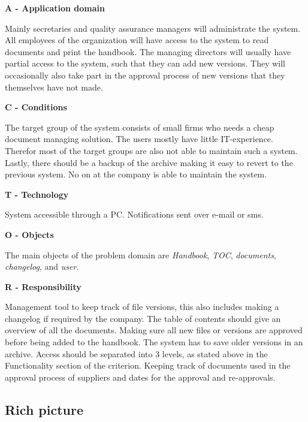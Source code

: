 \textbf{A - Application domain}

Mainly secretaries and quality assurance managers will administrate the system.
All employees of the organization will have access to the system to read documents and print the handbook.
The managing directors will usually have partial access to the system, such that they can add new versions.
They will occasionally also take part in the approval process of new versions that they themselves have not made.

\textbf{C - Conditions}

The target group of the system consists of small firms who needs a cheap document managing solution.
The users mostly have little IT-experience.
Therefor most of the target groups are also not able to maintain such a system.
Lastly, there should be a backup of the archive making it easy to revert to the previous system.
No on at the company is able to maintain the system.

\textbf{T - Technology}

System accessible through a PC.
Notifications sent over e-mail or sms.

\textbf{O - Objects}

The main objects of the problem domain are \textit{Handbook}, \textit{TOC}, \textit{documents}, \textit{changelog}, and \textit{user}.

\textbf{R  - Responsibility}

Management tool to keep track of file versions, this also includes making a changelog if required by the company.
The table of contents should give an overview of all the documents.
Making sure all new files or versions are approved before being added to the handbook.
The system has to save older versions in an archive.
Access should be separated into 3 levels, as stated above in the Functionality section of the criterion.
Keeping track of documents used in the approval process of suppliers and dates for the approval and re-approvals.

\subsection{Rich picture} \label{sec:richpictures}

